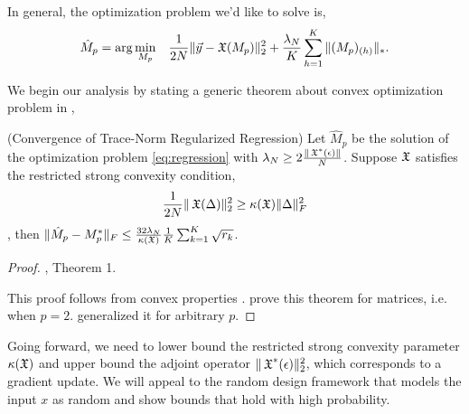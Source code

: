 In general, the optimization problem we'd like to solve is,
\begin{align}
  \hat M_p &= 
  \arg\min_{M_p}& \frac{1}{2N} \| \vec y - \operatorname{\mathfrak{X}}(M_p) \|_2^2 + \frac{\lambda_N}{K} \sum_{h=1}^K \| (M_p)_{(h)} \|_* \label{eq:regression}.
\end{align}

We begin our analysis by stating a generic theorem about convex
optimization problem in , 
\begin{lemma}(Convergence of Trace-Norm Regularized Regression)
  Let $\hat M_p$ be the solution of the optimization problem
  \eqref{eq:regression} with $\lambda_N \ge 2 \frac{\| \operatorname{\mathfrak{X}}^*(\epsilon)
  \|}{N}$. Suppose $\operatorname{\mathfrak{X}}$ satisfies the restricted strong convexity
  condition, $$\frac{1}{2N} \| \operatorname{\mathfrak{X}}( \Delta )\|_2^2 \ge \kappa(\operatorname{\mathfrak{X}})
  \|\Delta\|^2_F$$, then
  $\| \hat M_p - M_p^* \|_F \le \frac{32 \lambda_N}{\kappa(\operatorname{\mathfrak{X}})} \frac{1}{K} \sum_{k=1}^{K} \sqrt{r_k}$.
\end{lemma}
\begin{proof}
  \citet{Tomioka2011}, Theorem 1.

  This proof follows from convex properties .
  \citet{NegahbanWainwright2009} prove this theorem for matrices, i.e.
  when $p = 2$. \citet{Tomioka2011} generalized it for arbitrary $p$.
\end{proof}

Going forward, we need to lower bound the restricted strong convexity
parameter $\kappa(\operatorname{\mathfrak{X}})$ and upper bound the adjoint operator
$\|\operatorname{\mathfrak{X}}^*(\epsilon)\|_{2}^2$, which corresponds to a gradient update. We
will appeal to the random design framework that models the input $x$ as
random and show bounds that hold with high probability.

